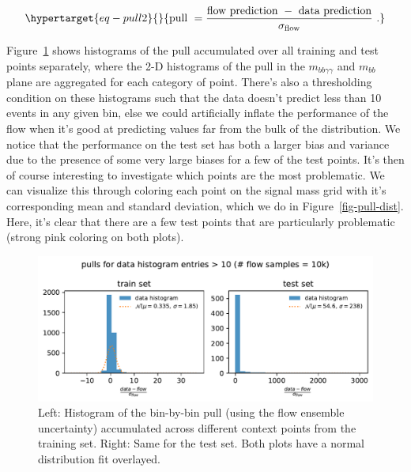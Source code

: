 \documentclass[
  11pt,
  numbers=noendperiod]{book}
\begin{document}
\begin{equation}\protect\hypertarget{eq-pull2}{}{
\text{pull } = \frac{\text{flow prediction }-\text{ data prediction}}{\sigma_{\text{flow}}}~.
}\label{eq-pull2}\end{equation}

Figure~\ref{fig-pulls-sh} shows histograms of the pull accumulated over
all training and test points separately, where the 2-D histograms of the
pull in the \(m_{bb\gamma\gamma}\) and \(m_{bb}\) plane are aggregated
for each category of point. There's also a thresholding condition on
these histograms such that the data doesn't predict less than 10 events
in any given bin, else we could artificially inflate the performance of
the flow when it's good at predicting values far from the bulk of the
distribution. We notice that the performance on the test set has both a
larger bias and variance due to the presence of some very large biases
for a few of the test points. It's then of course interesting to
investigate which points are the most problematic. We can visualize this
through coloring each point on the signal mass grid with it's
corresponding mean and standard deviation, which we do in
Figure~\ref{fig-pull-dist}. Here, it's clear that there are a few test
points that are particularly problematic (strong pink coloring on both
plots).

\begin{figure}

{\centering \includegraphics{./images/sh/sh-pulls-flow.pdf}

}

\caption{\label{fig-pulls-sh}Left: Histogram of the bin-by-bin pull
(using the flow ensemble uncertainty) accumulated across different
context points from the training set. Right: Same for the test set. Both
plots have a normal distribution fit overlayed.}

\end{figure}
\end{document}
